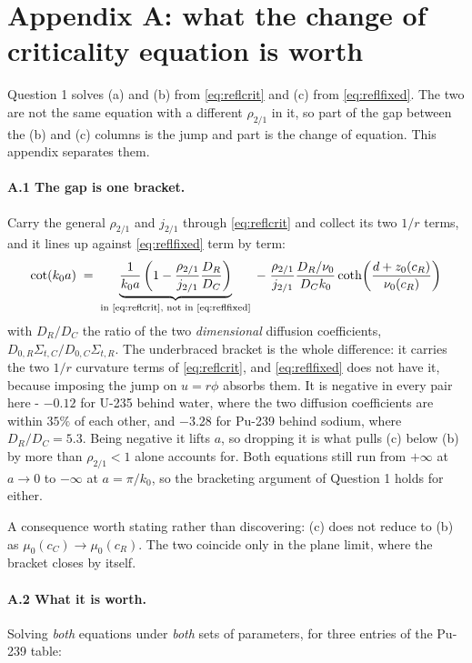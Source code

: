 {{\color{red}
\section*{Appendix A: what the change of criticality equation is worth}

Question 1 solves (a) and (b) from \eqref{eq:reflcrit} and (c) from \eqref{eq:reflfixed}. The
two are not the same equation with a different $\rho_{2/1}$ in it, so part of the gap between
the (b) and (c) columns is the jump and part is the change of equation. This appendix separates
them.

\paragraph{A.1 The gap is one bracket.} Carry the general $\rho_{2/1}$ and $j_{2/1}$ through
\eqref{eq:reflcrit} and collect its two $1/r$ terms, and it lines up against
\eqref{eq:reflfixed} term by term:
\begin{equation}
    \cot(k_0a) \;=\; \underbrace{\frac{1}{k_0a}\left(1 - \frac{\rho_{2/1}}{j_{2/1}}\frac{D_R}{D_C}\right)}_{\text{in \eqref{eq:reflcrit}, not in \eqref{eq:reflfixed}}} \;-\; \frac{\rho_{2/1}}{j_{2/1}}\frac{D_R/\nu_0}{D_C k_0}\coth\!\left(\frac{d + z_0(c_R)}{\nu_0(c_R)}\right)
    \label{eq:reflgap}
\end{equation}
with $D_R/D_C$ the ratio of the two \emph{dimensional} diffusion coefficients,
$D_{0,R}\Sigma_{t,C}/D_{0,C}\Sigma_{t,R}$. The underbraced bracket is the whole difference: it
carries the two $1/r$ curvature terms of \eqref{eq:reflcrit}, and \eqref{eq:reflfixed} does not
have it, because imposing the jump on $u = r\phi$ absorbs them. It is negative in every pair
here - $-0.12$ for U-235 behind water, where the two diffusion coefficients are within $35\%$
of each other, and $-3.28$ for Pu-239 behind sodium, where $D_R/D_C = 5.3$. Being negative it
lifts $a$, so dropping it is what pulls (c) below (b) by more than $\rho_{2/1} < 1$ alone
accounts for. Both equations still run from $+\infty$ at $a \to 0$ to $-\infty$ at
$a = \pi/k_0$, so the bracketing argument of Question 1 holds for either.

A consequence worth stating rather than discovering: (c) does not reduce to (b) as
$\mu_0(c_C) \to \mu_0(c_R)$. The two coincide only in the plane limit, where the bracket closes
by itself.

\paragraph{A.2 What it is worth.} Solving \emph{both} equations under \emph{both} sets of
parameters, for three entries of the Pu-239 table:

}}
